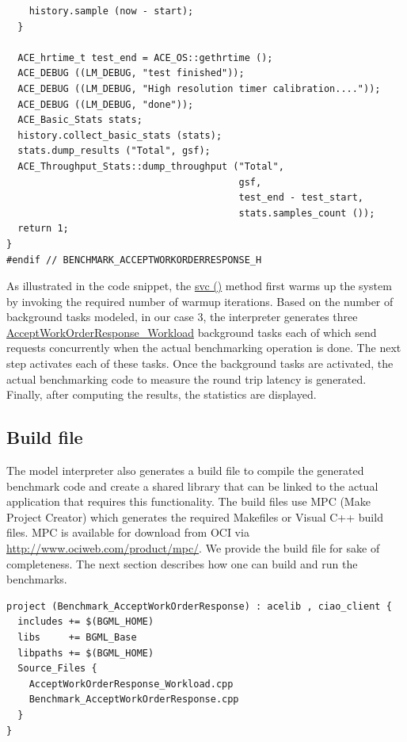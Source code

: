 \documentclass[onecolumn]{article}
\begin{document}
{\begin{verbatim}
    history.sample (now - start);
  }

  ACE_hrtime_t test_end = ACE_OS::gethrtime ();
  ACE_DEBUG ((LM_DEBUG, "test finished"));
  ACE_DEBUG ((LM_DEBUG, "High resolution timer calibration...."));
  ACE_DEBUG ((LM_DEBUG, "done"));
  ACE_Basic_Stats stats;
  history.collect_basic_stats (stats);
  stats.dump_results ("Total", gsf);
  ACE_Throughput_Stats::dump_throughput ("Total",
                                         gsf,
                                         test_end - test_start,
                                         stats.samples_count ());
  return 1;
}
#endif // BENCHMARK_ACCEPTWORKORDERRESPONSE_H

\end{verbatim}
}
\normalsize 
As illustrated in the code snippet, the \url{svc ()} method first warms up
the system by invoking the required number of warmup iterations. Based on the number
of background tasks modeled, in our case 3, the interpreter generates three
\url{AcceptWorkOrderResponse_Workload} background tasks each of which send requests
concurrently when the actual benchmarking operation is done. The next
step activates each of these tasks. Once the background tasks are
activated, the actual benchmarking code to measure the round trip
latency is generated. Finally, after computing the results, the
statistics are displayed.

\subsection* {Build file}
The model interpreter also generates a build file to compile the generated benchmark
code and create a shared library that can be linked to the actual application that
requires this functionality. The build files use MPC (Make Project Creator) which
generates the required Makefiles or Visual C++ build files. MPC is available for
download from OCI via \url{http://www.ociweb.com/product/mpc/}. We provide the
build file for sake of completeness. The next section describes how one can build
and run the benchmarks.

{
\footnotesize
\begin{verbatim}
project (Benchmark_AcceptWorkOrderResponse) : acelib , ciao_client {
  includes += $(BGML_HOME)
  libs     += BGML_Base
  libpaths += $(BGML_HOME)
  Source_Files {
    AcceptWorkOrderResponse_Workload.cpp
    Benchmark_AcceptWorkOrderResponse.cpp
  }
}
\end{verbatim}
}
\normalsize
\end{document}

